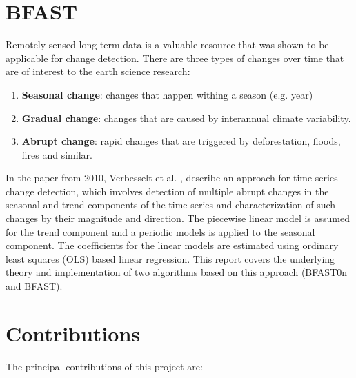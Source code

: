 \documentclass[main.tex]{subfiles}
\begin{document}
\section{BFAST}
\label{sec:changes}
Remotely sensed long term data is a valuable resource that was shown to be applicable for
change detection. There are three types of changes over time that are of
interest to the earth science research:
\begin{enumerate}
\item \textbf{Seasonal change}: changes that happen withing a season (e.g. year)
\item \textbf{Gradual change}: changes that are caused by interannual climate
  variability.
\item \textbf{Abrupt change}: rapid changes that are triggered by deforestation,
  floods, fires and similar.
\end{enumerate}
In the paper from 2010, Verbesselt et al. \cite{bfast}, describe an approach for
time series change detection, which involves
detection of multiple abrupt changes in the seasonal and trend components of the time series and
characterization of such changes by their magnitude and direction. The
piecewise linear model is assumed for the trend component and a
periodic models is applied to the seasonal component. The
coefficients for the linear models are estimated using ordinary least squares (OLS)
based linear regression.
This report covers the underlying theory and implementation of two algorithms based
on this approach (BFAST0n and BFAST).

\section{Contributions}
\label{sec:contributions}
The principal contributions of this project are: 
\end{document}
